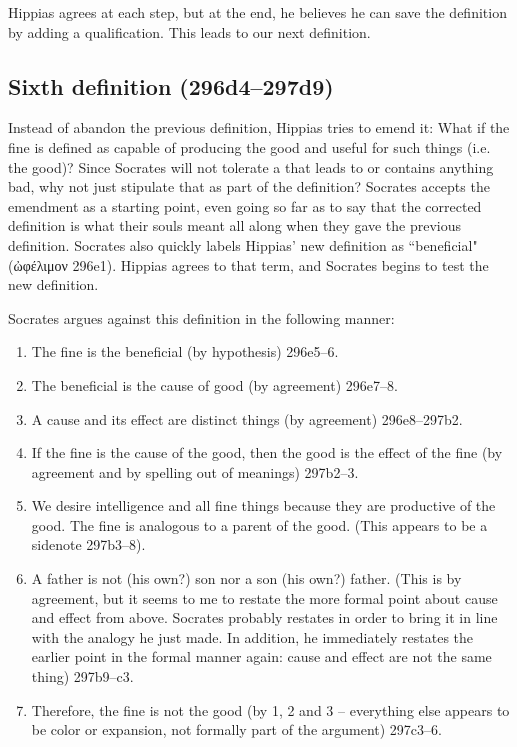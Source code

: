 \documentclass[11pt]{article}
\begin{document}
Hippias agrees at each step, but at the end, he believes he can save the
definition by adding a qualification.  This leads to our next definition.


\subsection{Sixth definition (296d4--297d9)}

Instead of abandon the previous definition, Hippias tries to emend it: What if
the fine is defined as capable of producing the good and useful for such things
(i.e. the good)?  Since Socrates will not tolerate a  that
leads to or contains anything bad, why not just stipulate that as part of the
definition?  Socrates accepts the emendment as a starting point, even going so
far as to say that the corrected definition is what their souls meant all along
when they gave the previous definition.  Socrates also quickly labels Hippias'
new definition as ``beneficial" ({\g ὠφέλιμον} 296e1).  Hippias agrees to that
term, and Socrates begins to test the new definition.

Socrates argues against this definition in the following manner:

\begin{enumerate}

    \item The fine is the beneficial (by hypothesis) 296e5--6.

    \item The beneficial is the cause of good (by agreement) 296e7--8.

    \item A cause and its effect are distinct things (by agreement)
        296e8--297b2.

    \item If the fine is the cause of the good, then the good is the effect of
        the fine (by agreement and by spelling out of meanings) 297b2--3.

    \item We desire intelligence and all fine things because they are
        productive of the good.  The fine is analogous to a parent of the good.
        (This appears to be a sidenote 297b3--8).

    \item A father is not (his own?) son nor a son (his own?) father. (This is
        by agreement, but it seems to me to restate the more formal point about
        cause and effect from above.  Socrates probably restates in order to
        bring it in line with the analogy he just made.  In addition, he
        immediately restates the earlier point in the formal manner again:
        cause and effect are not the same thing) 297b9--c3.

    \item Therefore, the fine is not the good (by 1, 2 and 3 -- everything else
        appears to be color or expansion, not formally part of the argument)
        297c3--6.

\end{enumerate}
\end{document}
